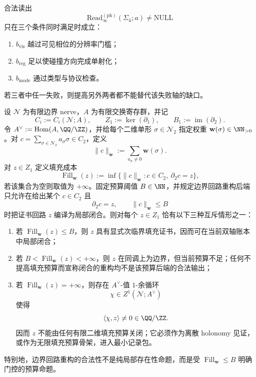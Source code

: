 \begin{proposition}[预算不可互偿]\label{prop:typed-address-biaxial-completion-budget-orthogonality}
合法读出
\[
\mathrm{Read}^{(\mathrm{ph})}_{\infty}(\Sigma_{\hat u};a)\neq \mathrm{NULL}
\]
只在三个条件同时满足时成立：
\begin{enumerate}
  \item \(b_{\mathrm{vis}}\) 越过可见相位的分辨率门槛；
  \item \(b_{\mathrm{reg}}\) 足以使碰撞方向完成单射化；
  \item \(b_{\mathrm{mode}}\) 通过类型与协议检查。
\end{enumerate}
若三者中任一失败，则提高另外两者都不能替代该失败轴的缺口。
\end{proposition}

\begin{theorem}\label{distill:gromov-filling_budget_closure_families-typed-boundary-fill-radius-dual-holonomy}
设 \(\mathcal N\) 为有限边界 nerve，\(A\) 为有限交换寄存群，并记
\[
C_i:=C_i(\mathcal N;A),\qquad Z_1:=\ker(\partial_1),\qquad B_1:=\operatorname{im}(\partial_2).
\]
令 \(A^\vee:=\operatorname{Hom}(A,\QQ/\ZZ)\)，并给每个二维单形 \(\sigma\in\mathcal N_2\) 指定权重 \(\mathbf w(\sigma)\in\NN_{>0}\)。对
\(c=\sum_{\sigma\in\mathcal N_2}a_\sigma\sigma\in C_2\)，定义
\[
\|c\|_{\mathbf w}:=\sum_{a_\sigma\ne0}\mathbf w(\sigma).
\]
对 \(z\in Z_1\) 定义填充成本
\[
\operatorname{Fill}_{\mathbf w}(z):=\inf\{\|c\|_{\mathbf w}:c\in C_2,\ \partial_2c=z\},
\]
若该集合为空则取值为 \(+\infty\)。固定预算阈值 \(B\in\NN\)，并规定边界回路重构后端只允许在给出某个 \(c\in C_2\) 且
\[
\partial_2c=z,\qquad \|c\|_{\mathbf w}\le B
\]
时把证书回路 \(z\) 编译为局部闭合。则对每个 \(z\in Z_1\) 恰有以下三种互斥情形之一：
\begin{enumerate}
  \item 若 \(\operatorname{Fill}_{\mathbf w}(z)\le B\)，则 \(z\) 具有显式次临界填充证书，因而可在当前双轴账本中局部闭合；
  \item 若 \(B<\operatorname{Fill}_{\mathbf w}(z)<+\infty\)，则 \(z\) 在同调上为边界，但当前预算不足；任何不提高填充预算而宣称闭合的重构均不是该预算后端的合法输出；
  \item 若 \(\operatorname{Fill}_{\mathbf w}(z)=+\infty\)，则存在 \(A^\vee\)-值 \(1\)-余循环
  \[
  \chi\in Z^1(\mathcal N;A^\vee)
  \]
  使得
  \[
  \langle\chi,z\rangle\ne0\in\QQ/\ZZ.
  \]
  因而 \(z\) 不能由任何有限二维填充预算关闭；它必须作为离散 holonomy 见证，或作为无限填充预算骨架，进入最小记录包。
\end{enumerate}
特别地，边界回路重构的合法性不是纯局部存在性命题，而是受 \(\operatorname{Fill}_{\mathbf w}\le B\) 明确门控的预算命题。
\end{theorem}

